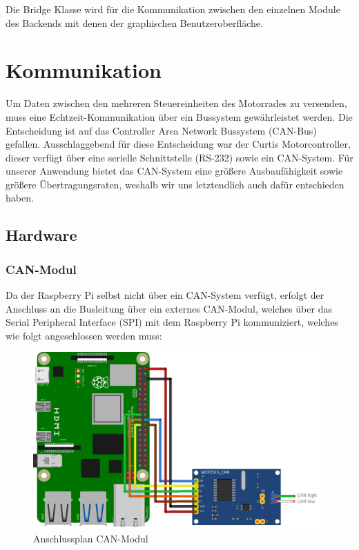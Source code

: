 Die Bridge Klasse wird für die Kommunikation zwischen den einzelnen Module des Backends mit denen der graphischen Benutzeroberfläche. 

\newpage


\section{Kommunikation}
Um Daten zwischen den mehreren Steuereinheiten des Motorrades zu versenden, muss eine Echtzeit-Kommunikation über ein Bussystem gewährleistet werden. Die Entscheidung ist auf das Controller Area Network Bussystem (CAN-Bus) gefallen. Ausschlaggebend für diese Entscheidung war der Curtis Motorcontroller, dieser verfügt über eine serielle Schnittstelle (RS-232) sowie ein CAN-System. Für unserer Anwendung bietet das CAN-System eine größere Ausbaufähigkeit sowie größere Übertragungsraten, weshalb wir uns letztendlich auch dafür entschieden haben.
\subsection{Hardware}
\subsubsection{CAN-Modul}
Da der Raspberry Pi selbst nicht über ein CAN-System verfügt, erfolgt der Anschluss an die Busleitung über ein externes CAN-Modul, welches über das Serial Peripheral Interface (SPI) mit dem Raspberry Pi kommuniziert, welches wie folgt angeschlossen werden muss: 
\begin{figure}[H]
	\begin{center}
		\includegraphics[scale=0.9]{figures/hcis/can_module.png}
		\caption{Anschlussplan CAN-Modul}
	\end{center}
\end{figure}

